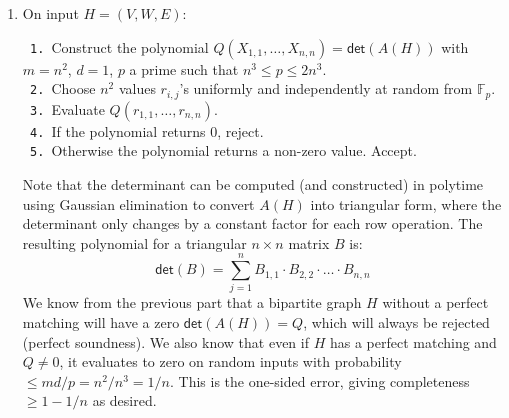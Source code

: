 \documentclass[12pt]{article}
\begin{document}
\begin{enumerate}
\begin{enumerate}
\begin{itemize}
\end{itemize}

\item %
On input $H = (V,W,E)$:

\verb+ 1. +Construct the polynomial
$Q(X_{1,1},\ldots,X_{n,n}) = \textsf{det}(A(H))$ with
$m = n^2$, $d = 1$, $p$ a prime such that $n^3 \le p \le 2n^3$.\\
\verb+ 2. +Choose $n^2$ values $r_{i,j}$'s uniformly and independently at
random from $\mathbb{F}_p$.\\
\verb+ 3. +Evaluate $Q(r_{1,1},\ldots,r_{n,n})$.\\
\verb+ 4. +If the polynomial returns 0, reject.\\
\verb+ 5. +Otherwise the polynomial returns a non-zero value. Accept.

Note that the determinant can be computed (and constructed)
in polytime using Gaussian elimination to convert $A(H)$ into triangular
form, where the determinant only changes by a constant factor for each
row operation. The resulting polynomial for a triangular $n\times n$
matrix $B$ is:
%
\begin{displaymath}
\textsf{det}(B) = \sum_{j=1}^n B_{1,1}\cdot B_{2,2}\cdot \ldots \cdot B_{n,n}
\end{displaymath}
%
We know from the previous part that a bipartite graph $H$ without a perfect
matching will have a zero $\textsf{det}(A(H)) = Q$, which will always be
rejected (perfect soundness).
We also know that even if $H$ has a perfect matching and $Q \ne 0$,
it evaluates to zero on random inputs with probability
$\le md/p = n^2/n^3 = 1/n$. This is the one-sided error, giving
completeness $\ge 1 - 1/n$ as desired.

\end{enumerate}

\end{enumerate}
\end{document}
